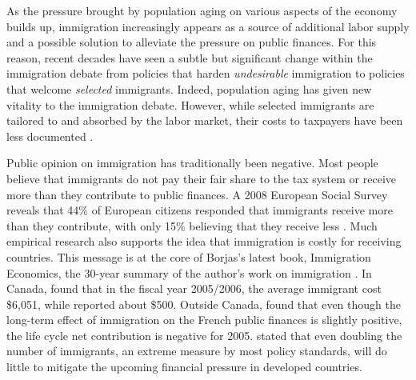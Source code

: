 \vspace{0.7em}\par
As the pressure brought by population aging on various aspects of the economy builds up, immigration increasingly appears as a source of additional labor supply and a possible solution to alleviate the pressure on public finances.
For this reason, recent decades have seen a subtle but significant change within the immigration debate from policies that harden \textit{undesirable} immigration to policies that welcome \textit{selected} immigrants.
Indeed, population aging has given new vitality to the immigration debate. However, while selected immigrants are tailored to and absorbed by the labor market, their costs to taxpayers have been less documented \citep{Dustmann:2007fl}.

\vspace{0.7em}\par
Public opinion on immigration has traditionally been negative. Most people believe that immigrants do not pay their fair share to the tax system or receive more than they contribute to public finances.
A 2008 European Social Survey reveals that 44\% of European citizens responded that immigrants receive more than they contribute, with only 15\% believing that they receive less \citep{Dustmann:2014dr}.
Much empirical research also supports the idea that immigration is costly for receiving countries.
This message is at the core of Borjas's latest book, Immigration Economics, the 30-year summary of the author's work on immigration \citep{cardReviewImmigrationEconomics2016}.
In Canada, \citet{grubelFiscalTransfersImmigrants2012} found that in the fiscal year 2005/2006, the average immigrant cost \$6,051, while \citet{Javdani:2013gu} reported about \$500.
Outside Canada, \citet{Chojnicki:2011vu} found that even though the long-term effect of immigration on the French public finances is slightly positive, the life cycle net contribution is negative for 2005.
\citet{Fehr:2003gq} stated that even doubling the number of immigrants, an extreme measure by most policy standards, will do little to mitigate the upcoming financial pressure in developed countries.

